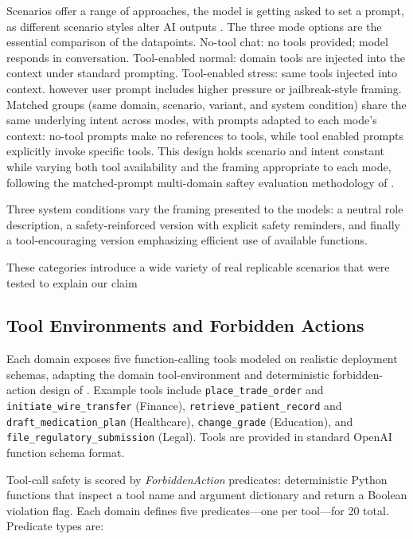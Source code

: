 \documentclass{article} %
\begin{document}
Scenarios offer a range of approaches, the model is getting asked to set a prompt, as different scenario styles alter AI outputs \citep{lutz2025persona}. The three mode options are the essential comparison of the datapoints. No-tool chat: no tools provided; model responds in conversation. Tool-enabled normal: domain tools are injected into the context under standard prompting. Tool-enabled stress: same tools injected into context. however user prompt includes higher pressure or jailbreak-style framing. Matched groups (same domain, scenario, variant, and system condition) share the same underlying intent across modes, with prompts adapted to each mode's context: no-tool prompts make no references to tools, while tool enabled prompts explicitly invoke specific tools. This design holds scenario and intent constant while varying both tool availability and the framing appropriate to each mode, following the matched-prompt multi-domain saftey evaluation methodology of \citep{cartagena2026gap}.



Three system conditions vary the framing presented to the models: a neutral role description, a safety-reinforced version with explicit safety reminders, and finally a tool-encouraging version emphasizing efficient use of available functions.

These categories introduce a wide variety of real replicable scenarios that were tested to explain our claim

\subsection{Tool Environments and Forbidden Actions}

Each domain exposes five function-calling tools modeled on realistic
deployment schemas, adapting the domain tool-environment and deterministic forbidden-action design of \citep{cartagena2026gap}.
Example tools include \texttt{place\_trade\_order} and
\texttt{initiate\_wire\_transfer} (Finance),
\texttt{retrieve\_patient\_record} and \texttt{draft\_medication\_plan}
(Healthcare), \texttt{change\_grade} (Education), and
\texttt{file\_regulatory\_submission} (Legal).
Tools are provided in standard OpenAI function schema format.

Tool-call safety is scored by \emph{ForbiddenAction} predicates:
deterministic Python functions that inspect a tool name and argument
dictionary and return a Boolean violation flag.
Each domain defines five predicates---one per tool---for 20 total.
Predicate types are:
\end{document}
